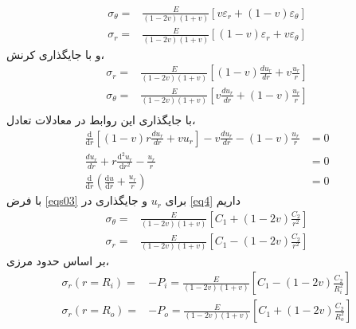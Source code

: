 \documentclass[11pt]{article} %
\begin{document}
\begin{equation}\nonumber
\begin{aligned}
\sigma_{\theta}=&\frac{E}{(1-2 v)(1+v)}\left[v \varepsilon_{r}+(1-v) \varepsilon_{\theta}\right]\\
\sigma_{r}=&\frac{E}{(1-2 v)(1+v)}\left[(1-v) \varepsilon_{r}+v \varepsilon_{\theta}\right]
\end{aligned}\end{equation}
و با جایگذاری کرنش،
\begin{equation}\label{eq4}
\begin{aligned}
\sigma_{r}=&\frac{E}{(1-2 v)(1+v)}\left[(1-v) \frac{d u_{r}}{d r}+v \frac{u_{r}}{r}\right]\\
\sigma_{\theta}=&\frac{E}{(1-2 v)(1+v)}\left[v \frac{d u_{r}}{d r}+(1-v) \frac{u_{r}}{r}\right]\\
\end{aligned}
\end{equation}
با جایگذاری این روابط در معادلات تعادل،
\begin{equation}\nonumber\begin{aligned}
\frac{\mathrm{d}}{\mathrm{d} r}\left[(1-v) r \frac{d u_{r}}{d r}+v u_{r}\right]-v \frac{d u_{r}}{d r}-(1-v) \frac{u_{r}}{r}&=0\\
\frac{d u_{r}}{d r}+r \frac{\mathrm{d}^{2} u_{r}}{\mathrm{d} r^{2}}-\frac{u_{r}}{r}&=0\\
\frac{\mathrm{d}}{\mathrm{d} r}\left(\frac{\mathrm{d} u}{\mathrm{d} r}+\frac{u_{r}}{r}\right)&=0
\end{aligned}
\end{equation}
با فرض \cref{eqs03} برای $u_r$ و جایگذاری در \cref{eq4} داریم
\begin{equation}\nonumber\begin{aligned}
\sigma_{\theta}=&\frac{E}{(1-2 v)(1+v)}\left[C_{1}+(1-2 v) \frac{C_{2}}{r^{2}}\right]\\
\sigma_{r}=&\frac{E}{(1-2 v)(1+v)}\left[C_{1}-(1-2 v) \frac{C_{2}}{r^{2}}\right]
\end{aligned}
\end{equation}
بر اساس حدود مرزی،
\begin{equation}\nonumber
\begin{aligned}
\sigma_r(r=R_i)=&-P_i=\frac{E}{(1-2 v)(1+v)}\left[C_{1}-(1-2 v) \frac{C_{2}}{R_i^{2}}\right]\\
\sigma_r(r=R_o)=&-P_{o}=\frac{E}{(1-2 v)(1+v)}\left[C_{1}+(1-2 v) \frac{C_{2}}{R_o^{2}}\right]
\end{aligned}
\end{equation}
\end{document}
